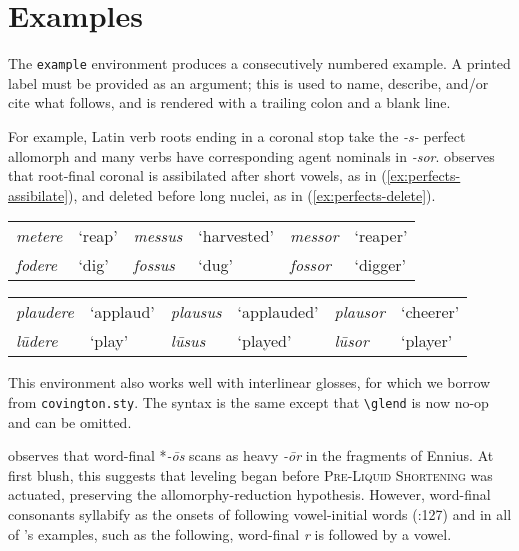 \documentclass[draft,12pt]{article}
\begin{document}
\section{Examples}

The \texttt{example} environment produces a consecutively numbered example. A printed label must be provided as an argument; this is used to name, describe, and/or cite what follows, and is rendered with a trailing colon and a blank line.

For example, Latin verb roots ending in a coronal stop take the \emph{-s-} perfect allomorph and many verbs have corresponding agent nominals in \emph{-sor}. \citet{Heslin1987} observes that root-final coronal is assibilated after short vowels, as in (\ref{ex:perfects-assibilate}),
and deleted before long nuclei, as in (\ref{ex:perfects-delete}).

\begin{example}
\label{ex:perfects-assibilate}
\begin{tabular}[H]{llllll}
\emph{metere} & `reap' & \emph{messus} & `harvested' & \emph{messor} & `reaper' \\
\emph{fodere} & `dig'  & \emph{fossus} & `dug'       & \emph{fossor} & `digger' \\
\end{tabular}
\end{example}

\begin{example}
\label{ex:perfects-delete}
\begin{tabular}[H]{llllll}
\emph{plaudere} & `applaud' & \emph{plausus} & `applauded' & \emph{plausor} & `cheerer'  \\
\emph{lūdere}   & `play'    & \emph{lūsus}   & `played'    & \emph{lūsor}   & `player' \\
\end{tabular}
\end{example}

This environment also works well with interlinear glosses, for which we borrow from \texttt{covington.sty}. The syntax is the same except that \verb|\glend| is now no-op and can be omitted.

\citet{Albright2005} observes that word-final *\emph{-ōs} scans as heavy \emph{-ōr} in the fragments of Ennius. At first blush, this suggests that leveling began before \textsc{Pre-Liquid Shortening} was actuated, preserving the allomorphy-reduction hypothesis. However, word-final consonants syllabify as the onsets of following vowel-initial words (\citealt{Allen1978}:127) and in all of \citeauthor{Albright2005}'s examples, such as the following, word-final \emph{r} is followed by a vowel.
\end{document}
